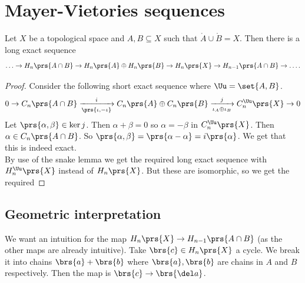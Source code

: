 \documentclass[10pt,a4paper,twoside,openany,hidelinks]{book}
\newcommand{\ra}{\rightarrow}
\begin{document}
\chapter{Mayer-Vietories sequences}
\begin{theorem}
Let $X$ be a topological space and $A,B \subseteq X$ such that $\mathring{A} \cup \mathring{B} = X$. Then there is a long exact sequence
\[\ldots \ra H_n\prs{A \cap B} \ra H_n\prs{A} \oplus H_n\prs{B} \ra H_n\prs{X} \ra H_{n-1}\prs{A \cap B} \ra \ldots \text{.}\]
\end{theorem}
\begin{proof}
Consider the following short exact sequence where $\Uu = \set{A, B}$.
\[0 \to C_n\prs{A \cap B} \xrightarrow[\prs{\iota,-\iota}]{i} C_n\prs{A} \oplus C_n\prs{B} \xrightarrow[\iota_A \oplus \iota_B]{j} C_n^{\Uu}\prs{X} \ra 0\]
Let $\prs{\alpha, \beta} \in \ker j$. Then $\alpha + \beta = 0$ so $\alpha = -\beta$ in $C_n^{\Uu}\prs{X}$. Then $\alpha \in C_n\prs{A \cap B}$. So $\prs{\alpha,\beta} = \prs{\alpha - \alpha} = i\prs{\alpha}$. We get that this is indeed exact.\\
By use of the snake lemma we get the required long exact sequence with $H_n^{\Uu}\prs{X}$ instead of $H_n\prs{X}$. But these are isomorphic, so we get the required 
\end{proof}
\section{Geometric interpretation}
We want an intuition for the map $H_n\prs{X} \ra H_{n-1}\prs{A \cap B}$ (as the other maps are already intuitive).
Take $\brs{c} \in H_n\prs{X}$ a cycle. We break it into chains $\brs{a} + \brs{b}$ where $\brs{a}, \brs{b}$ are chains in $A$ and $B$ respectively. Then the map is
$\brs{c} \ra \brs{\del a}$.
\end{document}
